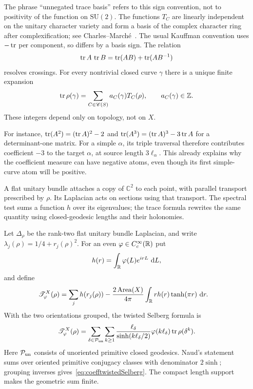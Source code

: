 The phrase ``unnegated trace basis'' refers to this sign convention,
not to positivity of the function on $\mathrm{SU}(2)$. The functions
$T_C$ are linearly independent on the unitary character variety and
form a basis of the complex character ring after complexification;
see Charles--March\'e~\cite[Theorem 1.1]{CharlesMarche}. The usual Kauffman
convention uses $-\operatorname{tr}$ per component, so differs by a basis sign.
The relation
\[
 \operatorname{tr} A\,\operatorname{tr} B=\operatorname{tr}(AB)+\operatorname{tr}(AB^{-1})
\]
resolves crossings. For every nontrivial closed curve $\gamma$ there
is a unique finite expansion
\begin{equation}
 \operatorname{tr}\rho(\gamma)=\sum_{C\in\mathscr C(S)}a_C(\gamma)T_C(\rho),
 \qquad a_C(\gamma)\in\mathbb Z.
 \label{eq:coeffcurveexpansion}
\end{equation}
These integers depend only on topology, not on $X$.

For instance, $\operatorname{tr}(A^2)=(\operatorname{tr} A)^2-2$ and
$\operatorname{tr}(A^3)=(\operatorname{tr} A)^3-3\operatorname{tr} A$ for a determinant-one matrix.
For a simple $\alpha$, its triple traversal therefore contributes
coefficient $-3$ to the target $\alpha$, at source length
$3\ell_\alpha$. This already explains why the coefficient measure
can have negative atoms, even though its first simple-curve atom
will be positive.

A flat unitary bundle attaches a copy of $\mathbb C^2$ to each
point, with parallel transport prescribed by $\rho$. Its Laplacian
acts on sections using that transport. The spectral test sums a
function $h$ over its eigenvalues; the trace formula rewrites the
same quantity using closed-geodesic lengths and their holonomies.

Let $\Delta_\rho$ be the rank-two flat unitary bundle Laplacian,
and write $\lambda_j(\rho)=1/4+r_j(\rho)^2$. For an even
$\varphi\in C_c^\infty(\mathbb R)$ put
\[
 h(r)=\int_\mathbb R\varphi(L)e^{irL}\,\mathop{}\!\mathrm d L,
\]
and define
\begin{align}
 \mathscr T^X_\varphi(\rho)
 &=\sum_j h(r_j(\rho))
 -\frac{2\operatorname{Area}(X)}{4\pi}
   \int_\mathbb R r h(r)\tanh(\pi r)\,\mathop{}\!\mathrm d r.\notag
\end{align}
With the two orientations grouped, the twisted Selberg formula is
\begin{equation}
 \mathscr T^X_\varphi(\rho)
 =\sum_{\delta\in\mathcal P_{\rm un}}
   \sum_{k\geq1}
   \frac{\ell_\delta}{\sinh(k\ell_\delta/2)}
   \varphi(k\ell_\delta)\operatorname{tr}\rho(\delta^k).
 \label{eq:coefftwistedSelberg}
\end{equation}
Here $\mathcal P_{\rm un}$ consists of unoriented primitive closed
geodesics. Naud's statement~\cite[Theorem 2.2]{NaudTwisted} sums
over oriented primitive conjugacy classes with denominator
$2\sinh$; grouping inverses gives~\eqref{eq:coefftwistedSelberg}.
The compact length support makes the geometric sum finite.

